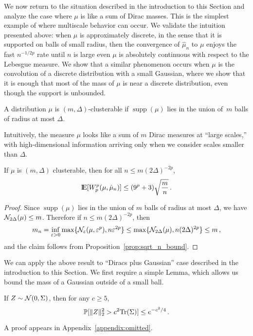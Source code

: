 \documentclass[sts]{imsart}
\newcommand{\p}{\mathbb{P}}
\newcommand*{\ep}{\varepsilon}
\DeclareMathOperator{\supp}{supp}
\begin{document}
We now return to the situation described in the introduction to this Section and analyze the case where $\mu$ is like a sum of Dirac masses.
This is the simplest example of where multiscale behavior can occur.
We validate the intuition presented above: when $\mu$ is approximately discrete, in the sense that it is supported on balls of small radius, then the convergence of $\hat \mu_n$ to $\mu$ enjoys the fast $n^{-1/2p}$ rate until $n$ is large even $\mu$ is absolutely continuous with respect to the Lebesgue measure.
We show that a similar phenomenon occurs when $\mu$ is the convolution of a discrete distribution with a small Gaussian, where we show that it is enough that most of the mass of $\mu$ is near a discrete distribution, even though the support is unbounded.

\begin{definition}
A distribution $\mu$ is $(m, \Delta)$-clusterable if $\supp(\mu)$ lies in the union of~$m$ balls of radius at most $\Delta$.
\end{definition}
Intuitively, the measure $\mu$ looks like a sum of $m$ Dirac measures at ``large scales,'' with high-dimensional information arriving only when we consider scales smaller than $\Delta$.

\begin{proposition}\label{prop:clusterable}
If $\mu$ is $(m, \Delta)$ clusterable, then for all $n \leq m (2 \Delta)^{-2p}$,
\begin{equation*}
{\rm I}\kern-0.18em{\rm E}[W^p_p(\mu, \hat \mu_n)] \leq (9^p + 3) \sqrt{\frac m n}\,.
\end{equation*}
\end{proposition}
\begin{proof}
Since $\supp(\mu)$ lies in the union of $m$ balls of radius at most $\Delta$, we have $\mathcal{N}_{2 \Delta}(\mu) \leq m$.
Therefore if $n \leq m (2 \Delta)^{-2p}$, then
\begin{equation*}
m_n = \inf_{\ep > 0} \max\{\cN_\ep(\mu, \ep^p), n \ep^{2p}\} \leq \max\{\cN_{2 \Delta}(\mu), n (2 \Delta)^{2p}\} \leq m\,,
\end{equation*}
and the claim follows from Proposition~\ref{prop:sqrt_n_bound}.
\end{proof}

We can apply the above result to ``Diracs plus Gaussian'' case described in the introduction to this Section.
We first require a simple Lemma, which allows us bound the mass of a Gaussian outside of a small ball.

\begin{lemma}\label{lem:gaussian_tail}
If $Z \sim \mathcal{N}(0, \Sigma)$, then for any $c \geq 5$,
\begin{equation*}
\p[\|Z\|^2_2 > c^2 \Tr(\Sigma)] \leq e^{-c^2/4}\,.
\end{equation*}
\end{lemma}
A proof appears in Appendix~\ref{appendix:omitted}.
\end{document}
